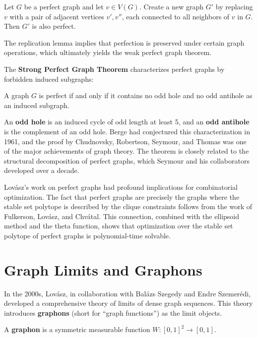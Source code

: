 \begin{lemma}
Let \(G\) be a perfect graph and let \(v \in V(G)\). Create a new graph \(G'\) by replacing \(v\) with a pair of adjacent vertices \(v', v''\), each connected to all neighbors of \(v\) in \(G\). Then \(G'\) is also perfect.
\end{lemma}

The replication lemma implies that perfection is preserved under certain graph operations, which ultimately yields the weak perfect graph theorem.

The \textbf{Strong Perfect Graph Theorem} characterizes perfect graphs by forbidden induced subgraphs:

\begin{theorem}
A graph \(G\) is perfect if and only if it contains no odd hole and no odd antihole as an induced subgraph.
\end{theorem}
An \textbf{odd hole} is an induced cycle of odd length at least 5, and an \textbf{odd antihole} is the complement of an odd hole. Berge had conjectured this characterization in 1961, and the proof by Chudnovsky, Robertson, Seymour, and Thomas was one of the major achievements of graph theory. The theorem is closely related to the structural decomposition of perfect graphs, which Seymour and his collaborators developed over a decade.

Lov\'{a}sz's work on perfect graphs had profound implications for combinatorial optimization. The fact that perfect graphs are precisely the graphs where the stable set polytope is described by the clique constraints follows from the work of Fulkerson, Lov\'{a}sz, and Chv\'{a}tal. This connection, combined with the ellipsoid method and the theta function, shows that optimization over the stable set polytope of perfect graphs is polynomial-time solvable.

\section{Graph Limits and Graphons}

In the 2000s, Lov\'{a}sz, in collaboration with Bal\'{a}zs Szegedy and Endre Szemer\'{e}di, developed a comprehensive theory of limits of dense graph sequences. This theory introduces \textbf{graphons} (short for ``graph functions'') as the limit objects.

\begin{definition}[Graphon]
A \textbf{graphon} is a symmetric measurable function \(W: [0,1]^2 \to [0,1]\).
\end{definition}

